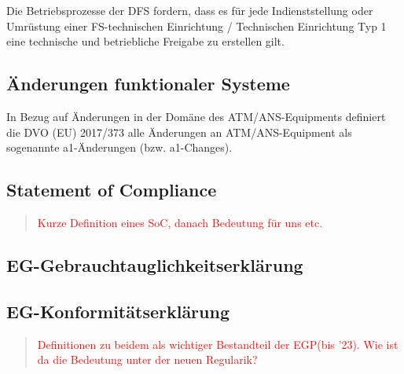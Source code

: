 Die Betriebsprozesse der \ac{DFS} fordern, dass es für jede Indienststellung oder Umrüstung einer FS-technischen Einrichtung / Technischen Einrichtung Typ 1 eine technische und betriebliche Freigabe zu erstellen gilt. \cite[nf.][]{fa_freigaben}

\subsection{Änderungen funktionaler Systeme}


In Bezug auf Änderungen in der Domäne des ATM/ANS-Equipments definiert die DVO (EU) 2017/373 alle Änderungen an ATM/ANS-Equipment als sogenannte a1-Änderungen (bzw. a1-Changes).




        \pagebreak
        \subsection{Statement of Compliance}

        \begin{quote}
\textcolor{red}{Kurze Definition eines SoC, danach Bedeutung für uns etc.}
\end{quote}

        \pagebreak
        \subsection{EG-Gebrauchtauglichkeitserklärung}
        \subsection{EG-Konformitätserklärung}

\begin{quote}
\textcolor{red}{Definitionen zu beidem als wichtiger Bestandteil der EGP(bis '23). Wie ist da die Bedeutung unter der neuen Regularik?}
\end{quote}
        
        \pagebreak
